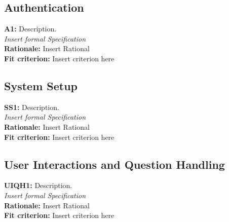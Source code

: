 \documentclass[12pt]{article}
\begin{document}
\subsection{Authentication}
\textbf{A1: } Description.\\
\textit{Insert formal Specification}\\
\textbf{Rationale: } Insert Rational\\
\textbf{Fit criterion: } Insert criterion here 

\subsection{System Setup}
\textbf{SS1: } Description.\\
\textit{Insert formal Specification}\\
\textbf{Rationale: } Insert Rational\\
\textbf{Fit criterion: } Insert criterion here 

\subsection{User Interactions and Question Handling}
\textbf{UIQH1: } Description.\\
\textit{Insert formal Specification}\\
\textbf{Rationale: } Insert Rational\\
\textbf{Fit criterion: } Insert criterion here 
\end{document}
